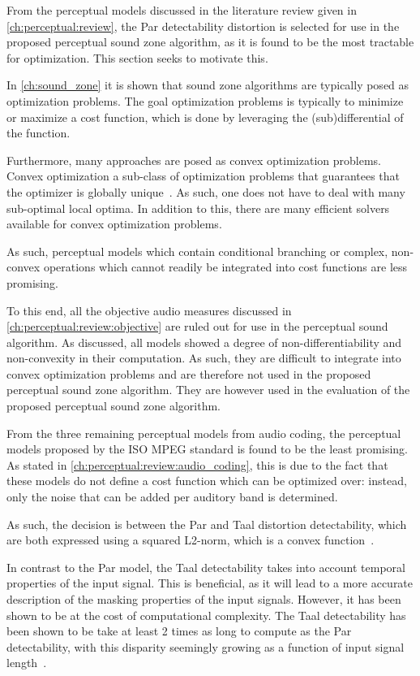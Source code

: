 From the perceptual models discussed in the literature review given in \autoref{ch:perceptual:review},
the Par detectability distortion is selected for use in the proposed perceptual sound zone algorithm, as it 
is found to be the most tractable for optimization.
This section seeks to motivate this.

In \autoref{ch:sound_zone} it is shown that sound zone algorithms are typically posed as optimization problems. 
The goal optimization problems is typically to minimize or maximize a cost function, 
which is done by leveraging the (sub)differential of the function.

Furthermore, many approaches are posed as convex optimization problems.
Convex optimization a sub-class of optimization problems that guarantees that the optimizer is 
globally unique~\cite{boyd2004convex}. 
As such, one does not have to deal with many sub-optimal local optima. 
In addition to this, there are many efficient solvers available for convex optimization problems.

As such, perceptual models which contain conditional branching or complex, non-convex operations which cannot readily 
be integrated into cost functions are less promising.

To this end, all the objective audio measures discussed in \autoref{ch:perceptual:review:objective} 
are ruled out for use in the perceptual sound algorithm. 
As discussed, all models showed a degree of non-differentiability and non-convexity in their computation.
As such, they are difficult to integrate into convex optimization problems and are therefore not used in the proposed 
perceptual sound zone algorithm.
They are however used in the evaluation of the proposed perceptual sound zone algorithm.

From the three remaining perceptual models from audio coding, 
the perceptual models proposed by the ISO MPEG standard is found to be the least promising.
As stated in \autoref{ch:perceptual:review:audio_coding}, this is due to the fact that these models do not define a cost function which can be optimized over:
instead, only the noise that can be added per auditory band is determined.

As such, the decision is between the Par and Taal distortion detectability, which are both expressed using a  
squared L2-norm, which is a convex function~\cite{boyd2004convex}.

In contrast to the Par model, the Taal detectability takes into account temporal properties of the input signal.
This is beneficial, as it will lead to a more accurate description of the masking properties of the input signals.
However, it has been shown to be at the cost of computational complexity.
The Taal detectability has been shown to be take at least 2 times as long to compute as the 
Par detectability, with this disparity seemingly growing as a function of input signal length~\cite{taal2012low}.


